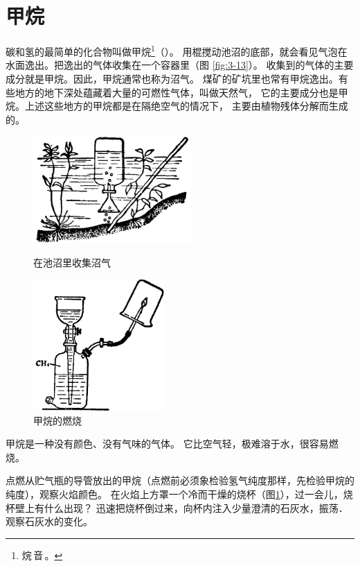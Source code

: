 \section{甲烷}\label{sec:3-7}

碳和氢的最简单的化合物叫做甲烷\footnote{烷\,音\,。}（）。
用棍搅动池沼的底部，就会看见气泡在水面逸出。把逸出的气体收集在一个容器里（图 \ref{fig:3-13}）。
收集到的气体的主要成分就是甲烷。因此，甲烷通常也称为沼气。
煤矿的矿坑里也常有甲烷逸出。有些地方的地下深处蕴藏着大量的可燃性气体，叫做天然气，
它的主要成分也是甲烷。上述这些地方的甲烷都是在隔绝空气的情况下，
主要由植物残体分解而生成的。

\begin{figure}[htbp]
    \centering
    \begin{minipage}[b]{7cm}
        \centering
        \includegraphics[width=6cm]{../pic/czhx1-ch3-13}
        \caption{在池沼里收集沼气}\label{fig:3-13}
    \end{minipage}
    \qquad
    \begin{minipage}[b]{7cm}
        \centering
        \includegraphics[width=5cm]{../pic/czhx1-ch3-14}
        \caption{甲烷的燃烧}\label{fig:3-14}
    \end{minipage}
\end{figure}

甲烷是一种没有颜色、没有气味的气体。
它比空气轻，极难溶于水，很容易燃烧。

\begin{shiyan}
    点燃从贮气瓶的导管放出的甲烷（点燃前必须象检验氢气纯度那样，先检验甲烷的纯度），观察火焰颜色。
    在火焰上方罩一个冷而干燥的烧杯（图\ref{fig:3-14}），过一会儿，烧杯壁上有什么出现？
    迅速把烧杯倒过来，向杯内注入少量澄清的石灰水，振荡．观察石灰水的变化。
\end{shiyan}


